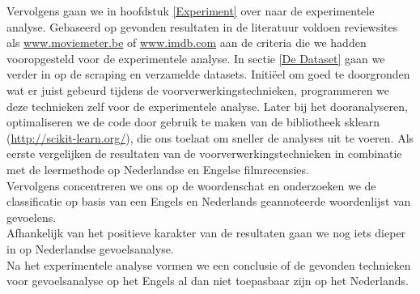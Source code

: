 Vervolgens gaan we in hoofdstuk \ref{Experiment} over naar de experimentele analyse. Gebaseerd op gevonden resultaten in de literatuur voldoen reviewsites als \url{www.moviemeter.be} of \url{www.imdb.com} aan de criteria die we hadden vooropgesteld voor de experimentele analyse.  In sectie \ref{De Dataset} gaan we verder in op de scraping en verzamelde datasets. Initi\"eel om goed te doorgronden wat er juist gebeurd tijdens de voorverwerkingstechnieken, programmeren we deze technieken zelf voor de experimentele analyse. Later bij het dooranalyseren, optimaliseren we de code door gebruik te maken van de bibliotheek sklearn (\url{http://scikit-learn.org/}), die ons toelaat om sneller de analyses uit te voeren. Als eerste vergelijken de resultaten van de voorverwerkingstechnieken in combinatie met de leermethode op Nederlandse en Engelse filmrecensies.\\
Vervolgens concentreren we ons op de woordenschat en  onderzoeken we de classificatie op basis van een Engels en Nederlands geannoteerde woordenlijst van gevoelens.\\
Afhankelijk van het positieve karakter van de resultaten gaan we nog iets dieper in op Nederlandse gevoelsanalyse.\\
Na het experimentele analyse vormen we een conclusie of de gevonden technieken voor gevoelsanalyse op het Engels al dan niet toepasbaar zijn op het Nederlands. 
